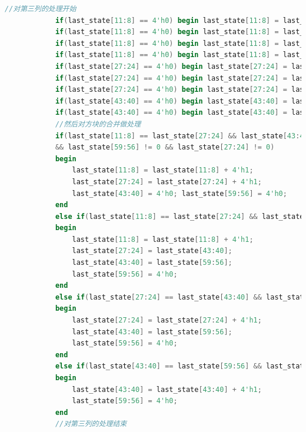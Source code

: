 \documentclass[UTF8]{article}
\begin{document}
\begin{lstlisting}[language=Verilog]
			//对第三列的处理开始
			if(last_state[11:8] == 4'h0) begin last_state[11:8] = last_state[27:24]; last_state[27:24] = last_state[43:40]; last_state[43:40] = last_state[59:56]; last_state[59:56] = 0; end
			if(last_state[11:8] == 4'h0) begin last_state[11:8] = last_state[27:24]; last_state[27:24] = last_state[43:40]; last_state[43:40] = last_state[59:56]; last_state[59:56] = 0; end
			if(last_state[11:8] == 4'h0) begin last_state[11:8] = last_state[27:24]; last_state[27:24] = last_state[43:40]; last_state[43:40] = last_state[59:56]; last_state[59:56] = 0; end
			if(last_state[11:8] == 4'h0) begin last_state[11:8] = last_state[27:24]; last_state[27:24] = last_state[43:40]; last_state[43:40] = last_state[59:56]; last_state[59:56] = 0; end
			if(last_state[27:24] == 4'h0) begin last_state[27:24] = last_state[43:40]; last_state[43:40] = last_state[59:56]; last_state[59:56] = 0; end
			if(last_state[27:24] == 4'h0) begin last_state[27:24] = last_state[43:40]; last_state[43:40] = last_state[59:56]; last_state[59:56] = 0; end
			if(last_state[27:24] == 4'h0) begin last_state[27:24] = last_state[43:40]; last_state[43:40] = last_state[59:56]; last_state[59:56] = 0; end
			if(last_state[43:40] == 4'h0) begin last_state[43:40] = last_state[59:56]; last_state[59:56] = 0; end
			if(last_state[43:40] == 4'h0) begin last_state[43:40] = last_state[59:56]; last_state[59:56] = 0; end
			//然后对方块的合并做处理
			if(last_state[11:8] == last_state[27:24] && last_state[43:40] == last_state[59:56]
			&& last_state[59:56] != 0 && last_state[27:24] != 0)
			begin
				last_state[11:8] = last_state[11:8] + 4'h1;
				last_state[27:24] = last_state[27:24] + 4'h1;
				last_state[43:40] = 4'h0; last_state[59:56] = 4'h0;
			end
			else if(last_state[11:8] == last_state[27:24] && last_state[27:24] != 0)
			begin
				last_state[11:8] = last_state[11:8] + 4'h1;
				last_state[27:24] = last_state[43:40];
				last_state[43:40] = last_state[59:56]; 
				last_state[59:56] = 4'h0;
			end
			else if(last_state[27:24] == last_state[43:40] && last_state[27:24] != 0)
			begin
				last_state[27:24] = last_state[27:24] + 4'h1;
				last_state[43:40] = last_state[59:56];
				last_state[59:56] = 4'h0;
			end
			else if(last_state[43:40] == last_state[59:56] && last_state[59:56] != 0)
			begin
				last_state[43:40] = last_state[43:40] + 4'h1; 
				last_state[59:56] = 4'h0;
			end
			//对第三列的处理结束
			

\end{lstlisting}
\end{document}
